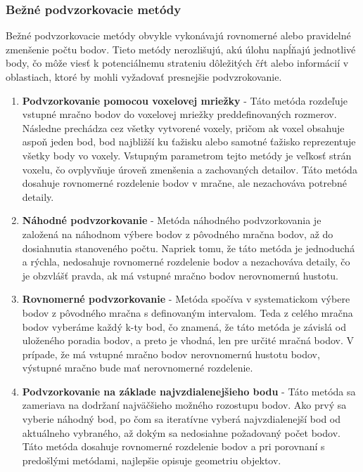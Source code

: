 \subsubsection{Bežné podvzorkovacie metódy}
\noindent Bežné podvzorkovacie metódy obvykle vykonávajú rovnomerné alebo pravidelné zmenšenie počtu bodov. Tieto metódy nerozlišujú, akú úlohu napĺňajú jednotlivé body, čo môže viesť k potenciálnemu strateniu dôležitých čŕt alebo informácií v oblastiach, ktoré by mohli vyžadovať presnejšie podvzrokovanie.
\begin{enumerate}
  \item\textbf{Podvzorkovanie pomocou voxelovej mriežky} - Táto metóda rozdeľuje vstupné mračno bodov do voxelovej mriežky preddefinovaných rozmerov. Následne prechádza cez všetky vytvorené voxely, pričom ak voxel obsahuje aspoň jeden bod, bod najbližší ku ťažisku alebo samotné ťažisko reprezentuje všetky body vo voxely. Vstupným parametrom tejto metódy je veľkosť strán voxelu, čo ovplyvňuje úroveň zmenšenia a zachovaných detailov. Táto metóda dosahuje rovnomerné rozdelenie bodov v mračne, ale nezachováva potrebné detaily.
  \item\textbf{Náhodné podvzorkovanie} - Metóda náhodného podvzorkovania je založená na náhodnom výbere bodov z pôvodného mračna bodov, až do dosiahnutia stanoveného počtu. Napriek tomu, že táto metóda je jednoduchá a rýchla, nedosahuje rovnomerné rozdelenie bodov a nezachováva detaily, čo je obzvlášť pravda, ak má vstupné mračno bodov nerovnomernú hustotu. 
  \item\textbf{Rovnomerné podvzorkovanie} - Metóda spočíva v systematickom výbere bodov z pôvodného mračna s definovaným intervalom. Teda z celého mračna bodov vyberáme každý k-ty bod, čo znamená, že táto metóda je závislá od uloženého poradia bodov, a preto je vhodná, len pre určité mračná bodov. V prípade, že má vstupné mračno bodov nerovnomernú hustotu bodov, 
  výstupné mračno bude mať nerovnomerné rozdelenie.
  \item\textbf{Podvzorkovanie na základe najvzdialenejšieho bodu} - Táto metóda sa zameriava na dodržaní najväčšieho možného rozostupu bodov. Ako prvý sa vyberie náhodný bod, po čom sa iteratívne vyberá najvzdialenejší bod od aktuálneho vybraného, až dokým sa nedosiahne požadovaný počet bodov. Táto metóda dosahuje rovnomerné rozdelenie bodov a pri porovnaní s predošlými metódami, najlepšie opisuje geometriu objektov.
\end{enumerate}
